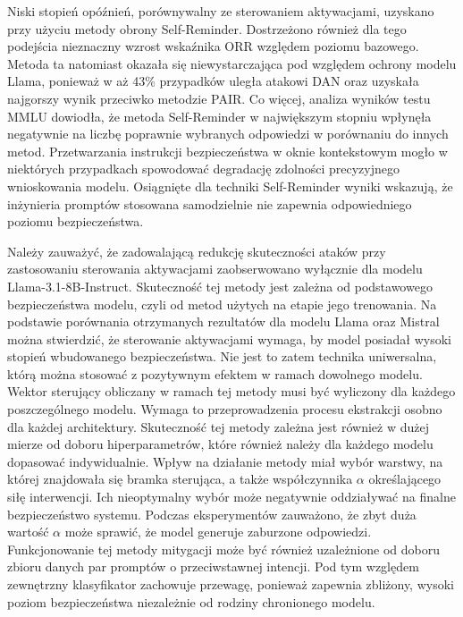 Niski stopień opóźnień, porównywalny ze sterowaniem aktywacjami, uzyskano przy użyciu metody obrony Self-Reminder. Dostrzeżono również dla tego podejścia nieznaczny wzrost wskaźnika \gls{ORR} względem poziomu bazowego. Metoda ta natomiast okazała się niewystarczająca pod względem ochrony modelu Llama, ponieważ w aż 43\% przypadków uległa atakowi \gls{DAN} oraz uzyskała najgorszy wynik przeciwko metodzie \gls{PAIR}. Co więcej, analiza wyników testu MMLU dowiodła, że metoda Self-Reminder w największym stopniu wpłynęła negatywnie na liczbę poprawnie wybranych odpowiedzi w porównaniu do innych metod. Przetwarzania instrukcji bezpieczeństwa w oknie kontekstowym mogło w niektórych przypadkach spowodować degradację zdolności precyzyjnego wnioskowania modelu. Osiągnięte dla techniki Self-Reminder wyniki wskazują, że inżynieria promptów stosowana samodzielnie nie zapewnia odpowiedniego poziomu bezpieczeństwa.

Należy zauważyć, że zadowalającą redukcję skuteczności ataków przy zastosowaniu sterowania aktywacjami zaobserwowano wyłącznie dla modelu Llama-3.1-8B-Instruct. Skuteczność tej metody jest zależna od podstawowego bezpieczeństwa modelu, czyli od metod użytych na etapie jego trenowania. Na podstawie porównania otrzymanych rezultatów dla modelu Llama oraz Mistral można stwierdzić, że sterowanie aktywacjami wymaga, by model posiadał wysoki stopień wbudowanego bezpieczeństwa. Nie jest to zatem technika uniwersalna, którą można stosować z pozytywnym efektem w ramach dowolnego modelu. Wektor sterujący obliczany w ramach tej metody musi być wyliczony dla każdego poszczególnego modelu. Wymaga to przeprowadzenia procesu ekstrakcji osobno dla każdej architektury. Skuteczność tej metody zależna jest również w dużej mierze od doboru hiperparametrów, które również należy dla każdego modelu dopasować indywidualnie. Wpływ na działanie metody miał wybór warstwy, na której znajdowała się bramka sterująca, a także współczynnika $\alpha$ określającego siłę interwencji. Ich nieoptymalny wybór może negatywnie oddziaływać na finalne bezpieczeństwo systemu. Podczas eksperymentów zauważono, że zbyt duża wartość $\alpha$ może sprawić, że model generuje zaburzone odpowiedzi. Funkcjonowanie tej metody mitygacji może być również uzależnione od doboru zbioru danych par promptów o przeciwstawnej intencji. Pod tym względem zewnętrzny klasyfikator zachowuje przewagę, ponieważ zapewnia zbliżony, wysoki poziom bezpieczeństwa niezależnie od rodziny chronionego modelu.
